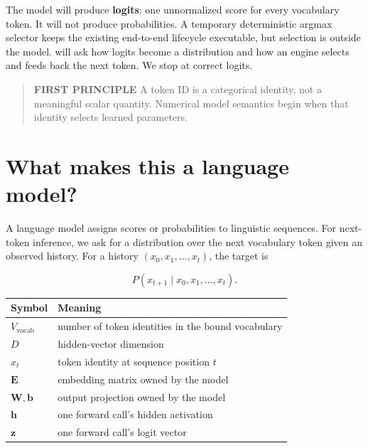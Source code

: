 The model will produce \textbf{logits}: one unnormalized score for every
vocabulary token. It will not produce probabilities. A temporary
deterministic argmax selector keeps the existing end-to-end lifecycle
executable, but selection is outside the model.  will ask how
logits become a distribution and how an engine selects and feeds back
the next token. We stop at correct logits.

\begin{quote}
\textbf{FIRST PRINCIPLE} A token ID is a categorical identity, not a
meaningful scalar quantity. Numerical model semantics begin when that
identity selects learned parameters.
\end{quote}

\section{What makes this a language
model?}\label{what-makes-this-a-language-model}

A language model assigns scores or probabilities to linguistic
sequences. For next-token inference, we ask for a distribution over the
next vocabulary token given an observed history. For a history
\((x_0,x_1,\ldots,x_t)\), the target is

\begin{equation}
P\!\left(x_{t+1}\mid x_0,x_1,\ldots,x_t\right).
\end{equation}

{\def\LTcaptype{none} %
\begin{longtable}[]{@{}
  >{\raggedright\arraybackslash}p{}
  >{\raggedright\arraybackslash}p{}@{}}
\toprule\noalign{}
\begin{minipage}[b]{\linewidth}\raggedright
Symbol
\end{minipage} & \begin{minipage}[b]{\linewidth}\raggedright
Meaning
\end{minipage} \\
\midrule\noalign{}
\endhead
\bottomrule\noalign{}
\endlastfoot
\(V_{\mathrm{vocab}}\) & number of token identities in the bound
vocabulary \\
\(D\) & hidden-vector dimension \\
\(x_t\) & token identity at sequence position \(t\) \\
\(\mathbf{E}\) & embedding matrix owned by the model \\
\(\mathbf{W},\mathbf{b}\) & output projection owned by the model \\
\(\mathbf{h}\) & one forward call's hidden activation \\
\(\mathbf{z}\) & one forward call's logit vector \\
\end{longtable}
}

